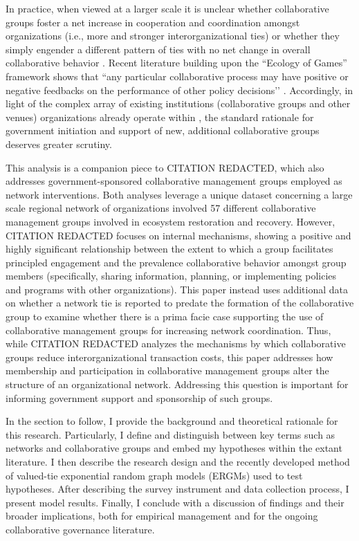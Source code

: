 \documentclass[12pt,a4paper,titlepage]{article}
\begin{document}
In practice, when viewed at a larger scale it is unclear whether collaborative groups foster a net increase in cooperation and coordination amongst organizations (i.e., more and stronger interorganizational ties) or whether they simply engender a different pattern of ties with no net change in overall collaborative behavior \parencite{lubell2010,lubell2011}. Recent literature building upon the ``Ecology of Games'' framework \parencite{berardo2010, lubell2011-a, mcallister2014, smaldino2014, niles2012} shows that “any particular collaborative process may have positive or negative feedbacks on the performance of other policy decisions’’ \parencite[424]{gerlak2012}. Accordingly, in light of the complex array of existing institutions (collaborative groups and other venues) organizations already operate within \parencite[see][]{lubell2013, lubell2011-a}, the standard rationale for government initiation and support of new, additional collaborative groups deserves greater scrutiny.

This analysis is a companion piece to CITATION REDACTED, which also addresses government-sponsored collaborative management groups employed as network interventions. Both analyses leverage a unique dataset concerning a large scale regional network of organizations involved 57 different collaborative management groups involved in ecosystem restoration and recovery. However, CITATION REDACTED focuses on internal mechanisms, showing a positive and highly significant relationship between the extent to which a group facilitates principled engagement and the prevalence collaborative behavior amongst group members (specifically, sharing information, planning, or implementing policies and programs with other organizations). This paper instead uses additional data on whether a network tie is reported to predate the formation of the collaborative group to examine whether there is a prima facie case supporting the use of collaborative management groups for increasing network coordination. Thus, while CITATION REDACTED analyzes the mechanisms by which collaborative groups reduce interorganizational transaction costs, this paper addresses how membership and participation in collaborative management groups alter the structure of an organizational network. Addressing this question is important for informing government support and sponsorship of such groups.

In the section to follow, I provide the background and theoretical rationale for this research. Particularly, I define and distinguish between key terms such as networks and collaborative groups and embed my hypotheses within the extant literature. I then describe the research design and the recently developed method of valued-tie exponential random graph models (ERGMs) \parencite{krivitsky2012, krivitsky2013} used to test hypotheses. After describing the survey instrument and data collection process, I present model results. Finally, I conclude with a discussion of findings and their broader implications, both for empirical management and for the ongoing collaborative governance literature.
\end{document}
